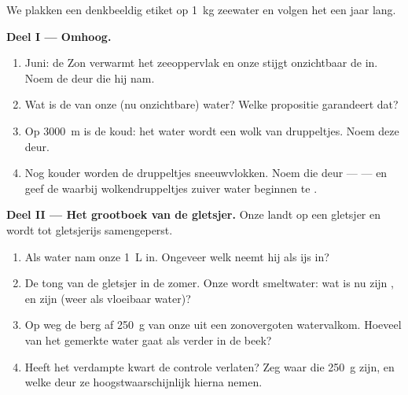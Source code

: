 \begin{problem}\label{pb:g6:water-states:1}
We plakken een denkbeeldig etiket op \qty{1}{kg} zeewater en volgen
het een jaar lang.

\medskip\noindent\textbf{Deel I --- Omhoog.}
\begin{enumerate}
  \item Juni: de Zon verwarmt het zeeoppervlak en onze
         stijgt onzichtbaar de  in. Noem de deur die hij
        nam.
  \item Wat is de  van onze (nu onzichtbare)  water?
        Welke propositie garandeert dat?
  \item Op \qty{3000}{m} is de  koud: het water wordt een wolk
        van druppeltjes. Noem deze deur.
  \item Nog kouder worden de druppeltjes sneeuwvlokken. Noem die deur
        ---  --- en geef de  waarbij
        wolkendruppeltjes zuiver water beginnen te .
\end{enumerate}

\medskip\noindent\textbf{Deel II --- Het grootboek van de gletsjer.}
Onze  landt op een gletsjer en wordt tot gletsjerijs
samengeperst.
\begin{enumerate}[resume]
  \item Als water nam onze  \qty{1}{L} in. Ongeveer welk
         neemt hij als ijs in?
  \item De tong van de gletsjer  in de zomer. Onze
         wordt smeltwater: wat is nu zijn , en zijn
         (weer als vloeibaar water)?
  \item Op weg de berg af  \qty{250}{g} van onze
         uit een zonovergoten waterval\-kom. Hoeveel van het
        gemerkte water gaat als  verder in de beek?
  \item Heeft het verdampte kwart de controle verlaten? Zeg waar die
        \qty{250}{g} zijn, en welke deur ze hoogstwaarschijnlijk
        hierna nemen.
\end{enumerate}


\end{problem}
